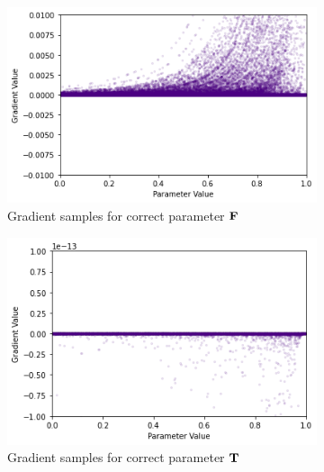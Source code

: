 \begin{figure}[ht]
    \centering
    \begin{subfigure}[b]{0.47\textwidth}
        \centering
        \includegraphics[width=\textwidth]{imgs/grad_ss_10_falseparam_100dim.png}
        \caption{Gradient samples for correct parameter $\textbf{F}$}
        \label{fig:conjgrad10falsess100}
    \end{subfigure}
    \begin{subfigure}[b]{0.47\textwidth}
        \centering
        \includegraphics[width=\textwidth]{imgs/grad_ss_10_trueparam_100dim.png}
        \caption{Gradient samples for correct parameter $\textbf{T}$}
        \label{fig:conjgrad10truess100}
    \end{subfigure}
    \begin{subfigure}[b]{0.47\textwidth}
        \centering

\end{subfigure}
\end{figure}
